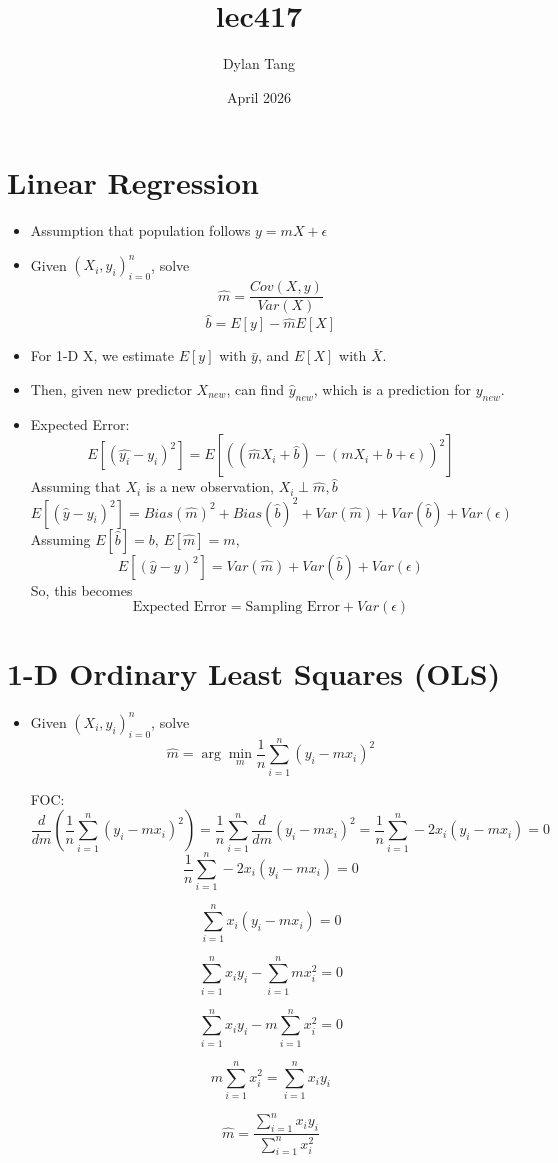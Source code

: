 \documentclass{article}
\title{lec417}
\author{Dylan Tang}
\date{April 2026}
\begin{document}
\maketitle

\section{Linear Regression}
\begin{itemize}
    \item Assumption that population follows $y = mX + \epsilon$
    \item Given $(X_i, y_i)_{i = 0}^n$, solve 
    \[
        \hat{m} = \frac{Cov(X,y)}{Var(X)}
    \]
    \[
        \hat{b} = E[y] - \hat{m}E[X]
    \]
    \item For 1-D X, we estimate $E[y]$ with $\bar{y}$, and $E[X]$ with $\bar{X}$.
    \item Then, given new predictor $X_{new}$, can find $\hat{y}_{new}$, which is a prediction for $y_{new}$.
    \item Expected Error:
    \[
        E[(\hat{y_i} - y_i)^2] = E[((\hat{m}X_i + \hat{b}) - (mX_i + b + \epsilon))^2]
    \]
    Assuming that $X_i$ is a new observation, $X_i \perp \hat{m}, \hat{b}$
    \[
        E[(\hat{y} - y_i)^2] =  Bias(\hat{m})^2 + Bias(\hat{b})^2 + Var(\hat{m}) + Var(\hat{b}) + Var(\epsilon)
    \]
    Assuming $E[\hat{b}] = b$, $E[\hat{m}] = m$,
    \[
        E[(\hat{y} - y)^2] = Var(\hat{m}) + Var(\hat{b}) + Var(\epsilon)
    \]
    So, this becomes
    \[
        \text{Expected Error} = \text{Sampling Error} + Var(\epsilon)
    \]
\end{itemize}

\section{1-D Ordinary Least Squares (OLS)}
\begin{itemize}
    \item Given $(X_i, y_i)_{i = 0}^n$, solve
    \[
        \hat{m} = \arg\min_m \frac{1}{n}\sum_{i=1}^n (y_i - m x_i)^2
    \]

    FOC:
    \[
        \frac{d}{dm}\left(\frac{1}{n}\sum_{i=1}^n (y_i - m x_i)^2\right)
        = \frac{1}{n}\sum_{i=1}^n \frac{d}{dm}(y_i - m x_i)^2
        = \frac{1}{n}\sum_{i=1}^n -2x_i(y_i - m x_i)
        = 0
    \]
    \[
        \frac{1}{n}\sum_{i=1}^n -2x_i(y_i-mx_i)=0
    \]
    
    \[
        \sum_{i=1}^n x_i(y_i-mx_i)=0
    \]
    
    \[
        \sum_{i=1}^n x_i y_i - \sum_{i=1}^n m x_i^2 = 0
    \]
    
    \[
        \sum_{i=1}^n x_i y_i - m\sum_{i=1}^n x_i^2 = 0
    \]
    
    \[
        m\sum_{i=1}^n x_i^2 = \sum_{i=1}^n x_i y_i
    \]
    
    \[
        \hat{m}=\frac{\sum_{i=1}^n x_i y_i}{\sum_{i=1}^n x_i^2}
    \]
    
\end{itemize}
\end{document}
